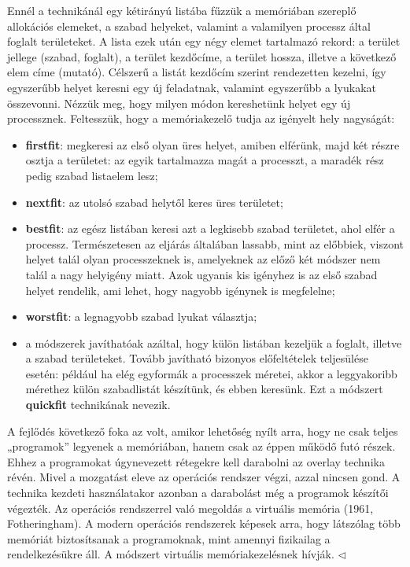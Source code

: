\documentclass[tikz,12pt,margin=0px]{article}
\begin{document}
    \noindent Ennél a technikánál egy kétirányú listába fűzzük a memóriában szereplő allokációs elemeket, a szabad helyeket, valamint a valamilyen processz által foglalt területeket. A lista ezek után egy négy elemet tartalmazó rekord: a terület jellege (szabad, foglalt), a terület kezdőcíme, a terület hossza, illetve a következő elem címe (mutató). Célszerű a listát kezdőcím szerint rendezetten kezelni, így egyszerűbb helyet keresni egy új feladatnak, valamint egyszerűbb a lyukakat összevonni. Nézzük meg, hogy milyen módon kereshetünk helyet egy új processznek. Feltesszük, hogy a memóriakezelő tudja az igényelt hely nagyságát:
    \begin{itemize}[topsep=8pt,itemsep=4pt,partopsep=4pt, parsep=4pt]
        \item \textbf{firstfit}: megkeresi az első olyan üres helyet, amiben elférünk, majd két részre osztja a területet: az egyik tartalmazza magát a processzt, a maradék rész pedig szabad listaelem lesz;
        \item \textbf{nextfit}: az utolsó szabad helytől keres üres területet;
        \item \textbf{bestfit}: az egész listában keresi azt a legkisebb szabad területet, ahol elfér a processz. Természetesen az eljárás általában lassabb, mint az előbbiek, viszont helyet talál olyan processzeknek is, amelyeknek az előző két módszer nem talál a nagy helyigény miatt. Azok ugyanis kis igényhez is az első szabad helyet rendelik, ami lehet, hogy nagyobb igénynek is megfelelne;
\newpage
        \item \textbf{worstfit}: a legnagyobb szabad lyukat választja;
        \item a módszerek javíthatóak azáltal, hogy külön listában kezeljük a foglalt, illetve a szabad területeket. Tovább javítható bizonyos előfeltételek teljesülése esetén: például ha elég egyformák a processzek méretei, akkor a leggyakoribb mérethez külön szabadlistát készítünk, és ebben keresünk. Ezt a módszert \textbf{quickfit} technikának nevezik.

    \end{itemize}

    {\footnotesize \noindent {\color{blue} \faLightbulbO\ $\triangleright$ } }
    {\footnotesize
    \noindent A fejlődés következő foka az volt, amikor lehetőség nyílt arra, hogy ne csak teljes „programok” legyenek a memóriában, hanem csak az éppen működő futó részek. Ehhez a programokat úgynevezett rétegekre kell darabolni az overlay technika révén. Mivel a mozgatást eleve az operációs rendszer végzi, azzal nincsen gond. A technika kezdeti használatakor azonban a darabolást még a programok készítői végezték. Az operációs rendszerrel való megoldás a virtuális memória (1961, Fotheringham). A modern operációs rendszerek képesek arra, hogy látszólag több memóriát biztosítsanak a programoknak, mint amennyi fizikailag a rendelkezésükre áll. A módszert virtuális memóriakezelésnek hívják.
    $\triangleleft$ \faLightbulbO}\\
\end{document}
